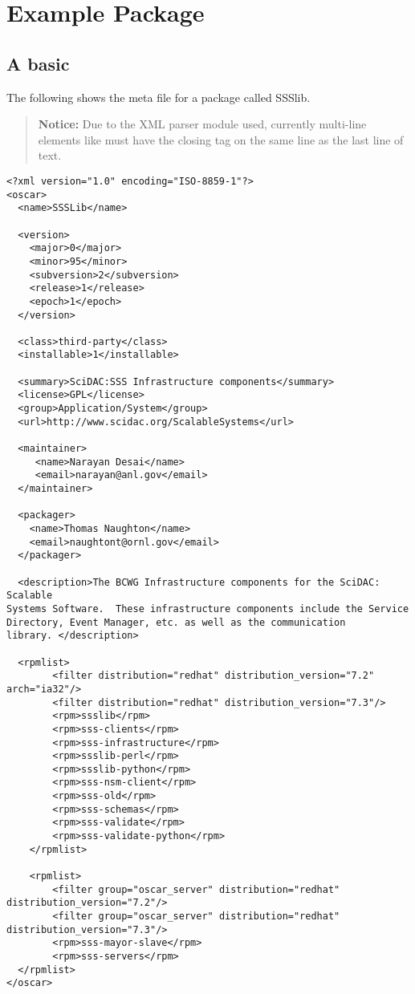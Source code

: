 
\section{Example Package}
\label{sect:example-pkg}

\subsection{A basic }
\label{sect:example-config-xml}

The following shows the meta file for a package called SSSlib.  

\begin{verse}
   {\bfseries Notice: } Due to the XML parser module used, currently
   multi-line elements like  must have the closing tag
   on the same line as the last line of text.  
\end{verse}


\begin{scriptsize}
\begin{verbatim}
<?xml version="1.0" encoding="ISO-8859-1"?>
<oscar>
  <name>SSSLib</name>

  <version>
    <major>0</major>
    <minor>95</minor>
    <subversion>2</subversion>
    <release>1</release>
    <epoch>1</epoch>
  </version>

  <class>third-party</class>
  <installable>1</installable>

  <summary>SciDAC:SSS Infrastructure components</summary>
  <license>GPL</license>
  <group>Application/System</group>
  <url>http://www.scidac.org/ScalableSystems</url>
  
  <maintainer>
     <name>Narayan Desai</name>
     <email>narayan@anl.gov</email>
  </maintainer>

  <packager>
    <name>Thomas Naughton</name>
    <email>naughtont@ornl.gov</email>
  </packager>

  <description>The BCWG Infrastructure components for the SciDAC: Scalable 
Systems Software.  These infrastructure components include the Service 
Directory, Event Manager, etc. as well as the communication 
library. </description>

  <rpmlist>
        <filter distribution="redhat" distribution_version="7.2" arch="ia32"/>
        <filter distribution="redhat" distribution_version="7.3"/>
        <rpm>ssslib</rpm>
        <rpm>sss-clients</rpm>
        <rpm>sss-infrastructure</rpm>
        <rpm>ssslib-perl</rpm>
        <rpm>ssslib-python</rpm>
        <rpm>sss-nsm-client</rpm>
        <rpm>sss-old</rpm>
        <rpm>sss-schemas</rpm>
        <rpm>sss-validate</rpm>
        <rpm>sss-validate-python</rpm>
	</rpmlist>

	<rpmlist>
        <filter group="oscar_server" distribution="redhat" distribution_version="7.2"/>
        <filter group="oscar_server" distribution="redhat" distribution_version="7.3"/>
        <rpm>sss-mayor-slave</rpm>
        <rpm>sss-servers</rpm>
  </rpmlist>
</oscar>
\end{verbatim}
\end{scriptsize}


